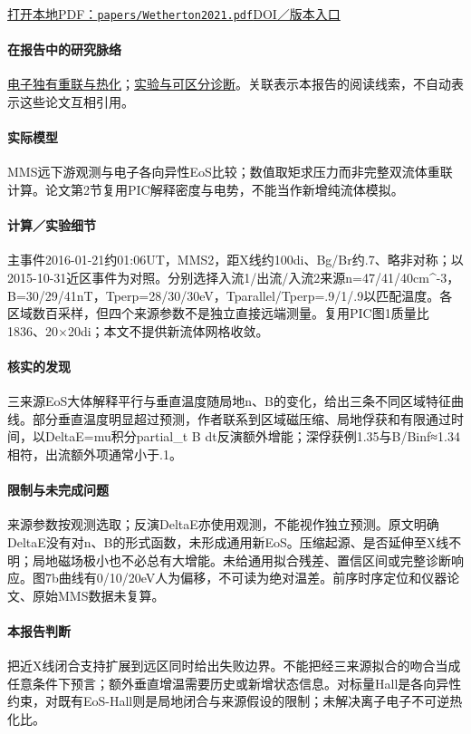 \href{run:papers/Wetherton2021.pdf}{打开本地PDF：\texttt{papers/Wetherton2021.pdf}}\quad\href{https://doi.org/10.1029/2020JA028604}{DOI／版本入口}

\paragraph{在报告中的研究脉络}\hyperref[story:energy]{电子独有重联与热化}；\hyperref[story:diagnostic]{实验与可区分诊断}。关联表示本报告的阅读线索，不自动表示这些论文互相引用。

\paragraph{实际模型}MMS远下游观测与电子各向异性EoS比较；数值取矩求压力而非完整双流体重联计算。论文第2节复用PIC解释密度与电势，不能当作新增纯流体模拟。

\paragraph{计算／实验细节}主事件2016-01-21约01:06UT，MMS2，距X线约100di、Bg/Br约.7、略非对称；以2015-10-31近区事件为对照。分别选择入流1/出流/入流2来源n=47/41/40cm\textasciicircum{}-3，B=30/29/41nT，Tperp=28/30/30eV，Tparallel/Tperp=.9/1/.9以匹配温度。各区域数百采样，但四个来源参数不是独立直接远端测量。复用PIC图1质量比1836、20×20di；本文不提供新流体网格收敛。

\paragraph{核实的发现}三来源EoS大体解释平行与垂直温度随局地n、B的变化，给出三条不同区域特征曲线。部分垂直温度明显超过预测，作者联系到区域磁压缩、局地俘获和有限通过时间，以DeltaE=mu积分partial\_t B dt反演额外增能；深俘获例1.35与B/Binf≈1.34相符，出流额外项通常小于.1。

\paragraph{限制与未完成问题}来源参数按观测选取；反演DeltaE亦使用观测，不能视作独立预测。原文明确DeltaE没有对n、B的形式函数，未形成通用新EoS。压缩起源、是否延伸至X线不明；局地磁场极小也不必总有大增能。未给通用拟合残差、置信区间或完整诊断响应。图7b曲线有0/10/20eV人为偏移，不可读为绝对温差。前序时序定位和仪器论文、原始MMS数据未复算。

\paragraph{本报告判断}把近X线闭合支持扩展到远区同时给出失败边界。不能把经三来源拟合的吻合当成任意条件下预言；额外垂直增温需要历史或新增状态信息。对标量Hall是各向异性约束，对既有EoS-Hall则是局地闭合与来源假设的限制；未解决离子电子不可逆热化比。

